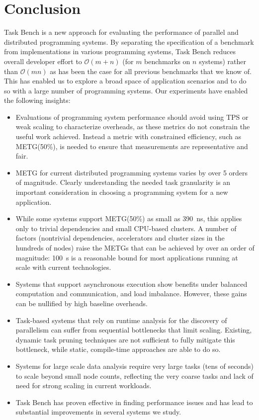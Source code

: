 \section{Conclusion}
\label{sec:conclusion}

Task Bench is a new approach for evaluating the performance of
parallel and distributed programming systems. By separating the
specification of a benchmark from implementations in various
programming systems, Task Bench reduces overall developer effort to
$\mathcal{O}(m + n)$ (for $m$ benchmarks on $n$ systems) rather than
$\mathcal{O}(mn)$ as has been the case for all previous
benchmarks that we know of. This has enabled us to explore a broad space of
application scenarios and to do so with a large number of programming
systems. Our experiments have enabled the following
insights:

\begin{itemize}
\item Evaluations of programming system performance should avoid using
  TPS or weak scaling to characterize overheads, as these metrics do
  not constrain the useful work achieved. Instead a metric with
  constrained efficiency, such as METG(50\%), is needed to ensure that
  measurements are representative and fair.

\item METG for current distributed programming systems varies by over
  5 orders of magnitude.  Clearly understanding the needed task
  granularity is an important consideration in choosing a programming
  system for a new application.

\item While some systems support METG(50\%) as small as 390~ns, this applies only to trivial dependencies and small CPU-based clusters. A number of factors (nontrivial dependencies, accelerators and cluster sizes in the hundreds of nodes) raise
  the METGs that can be achieved by over an order of magnitude: 100~\textmu{}s is a reasonable bound for most applications running at scale with current technologies.

\item Systems that support asynchronous execution show benefits under
  balanced computation
  and communication, and load imbalance. However, these gains can be nullified by
  high baseline overheads.

\item Task-based systems that rely on runtime analysis for the
  discovery of parallelism can suffer from sequential bottlenecks that
  limit scaling. Existing, dynamic task pruning techniques are not
  sufficient to fully mitigate this bottleneck, while static,
  compile-time approaches are able to do so.

\item Systems for large scale data analysis require very large tasks
  (tens of seconds) to scale beyond small node counts,
  reflecting the very coarse tasks and lack of need for strong scaling
  in current workloads.

\item Task Bench has proven effective in finding performance issues
  and has lead to substantial improvements in several systems
  we study.
\end{itemize}

